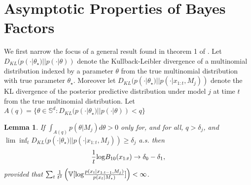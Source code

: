 \documentclass[11pt]{article}
\def\log{{\rm log}}
\newtheorem{lemma}{Lemma}[section]
\begin{document}
\section{Asymptotic Properties of Bayes Factors}
\label{app:asymptotics}
We first narrow the focus of a general result found in theorem 1 of \cite{walker}.
Let $D_{KL}(p(\cdot|\theta_\star)||p(\cdot|\theta) )$ denote the Kullback-Leibler divergence of a multinomial distribution indexed by a parameter $\theta$ from the true multinomial distribution with true parameter $\theta_{\star}$.
Moreover let $D_{KL}(p(\cdot|\theta_\star)||p(\cdot|x_{1:t}, M_j) )$ denote the KL divergence of the posterior predictive distribution under model $j$ at time $t$ from the true multinomial distribution.
Let $A(q) = \lbrace \theta \in \mathbb{S}^d : D_{KL}(p(\cdot|\theta_\star)||p(\cdot|\theta) ) < q \rbrace$
\begin{lemma}
  \label{lemma:walker}
  If $\int_{A(q)} p(\theta|M_j) d\theta > 0$ only for, and for all, $q > \delta_j$, and $\lim \inf_t D_{KL}(p(\cdot|\theta_\star)||p(\cdot|x_{1:t}, M_j) ) \geq \delta_j$ a.s.
then
  \begin{equation}
    \label{eq:bayes_factor_convergence}
    \frac{1}{t} \log B_{10}(x_{1:t}) \rightarrow \delta_0 - \delta_1,
  \end{equation}
  provided that $\sum_t \frac{1}{t^2} \left( \mathbb{V}[\log \frac{p(x_t|x_{1:t-1},M_j)}{p(x_t|M_\star )}]\right) < \infty$.
\end{lemma}
\end{document}
